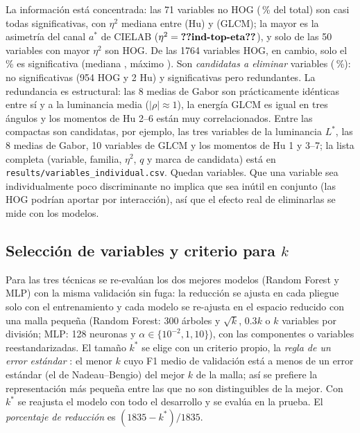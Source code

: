 \documentclass[journal]{IEEEtran}
\begin{document}
La información está concentrada: las 71 variables no HOG (\,\% del total) son casi todas significativas, con $\eta^2$ mediana entre  (Hu) y  (GLCM); la mayor es la asimetría del canal $a^*$ de CIELAB ($\eta^2=\N{ind-top-eta}$), y solo  de las 50 variables con mayor $\eta^2$ son HOG. De las 1764 variables HOG, en cambio, solo el \,\% es significativa (mediana , máximo ). Son \emph{candidatas a eliminar}  variables (\,\%):  no significativas (954 HOG y 2 Hu) y  significativas pero redundantes. La redundancia es estructural: las 8 medias de Gabor son prácticamente idénticas entre sí y a la luminancia media (\mbox{$|\rho|\approx1$}), la energía GLCM es igual en tres ángulos y los momentos de Hu 2--6 están muy correlacionados. Entre las compactas son candidatas, por ejemplo, las tres variables de la luminancia $L^*$, las 8 medias de Gabor, 10 variables de GLCM y los momentos de Hu 1 y 3--7; la lista completa (variable, familia, $\eta^2$, $q$ y marca de candidata) está en \texttt{results/\allowbreak variables\_individual.csv}. Quedan  variables. Que una variable sea individualmente poco discriminante no implica que sea inútil en conjunto (las HOG podrían aportar por interacción), así que el efecto real de eliminarlas se mide con los modelos.

\subsection{Selección de variables y criterio para $k$}\label{sec:sel}
Para las tres técnicas se re-evalúan los dos mejores modelos (Random Forest y MLP) con la misma validación sin fuga: la reducción se ajusta en cada pliegue solo con el entrenamiento y cada modelo se re-ajusta en el espacio reducido con una malla pequeña (Random Forest: 300 árboles y $\sqrt k$, $0.3k$ o $k$ variables por división; MLP: 128 neuronas y $\alpha\in\{10^{-2},1,10\}$), con las componentes o variables reestandarizadas. El tamaño $k^*$ se elige con un criterio propio, la \emph{regla de un error estándar} \cite{hastie2009}: el menor $k$ cuyo F1 medio de validación está a menos de un error estándar (el de Nadeau--Bengio) del mejor $k$ de la malla; así se prefiere la representación más pequeña entre las que no son distinguibles de la mejor. Con $k^*$ se reajusta el modelo con todo el desarrollo y se evalúa en la prueba. El \emph{porcentaje de reducción} es $(1835-k^*)/1835$.
\end{document}
